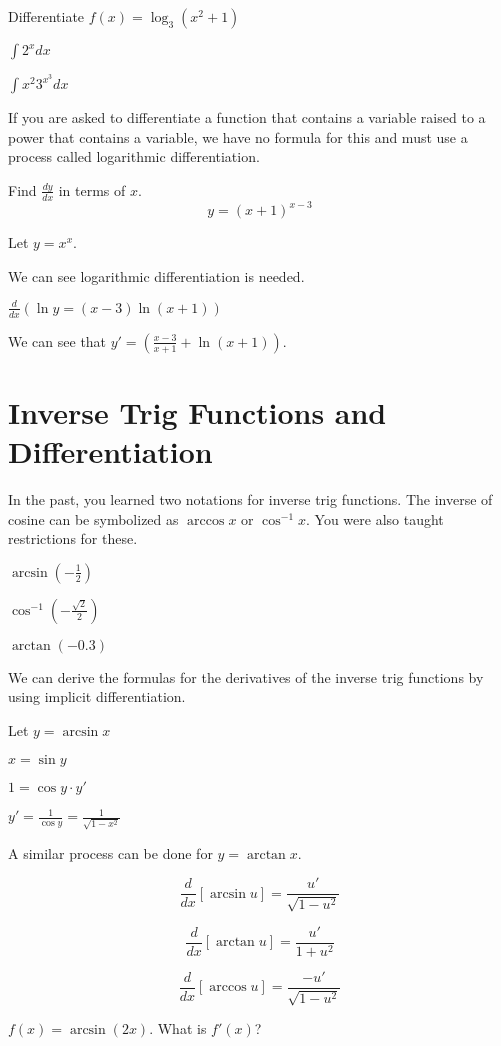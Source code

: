 \documentclass[../bccalc.tex]{subfiles}
\begin{document}
\ex Differentiate $f(x)=\log_3 (x^2+1)$

\ex $\int 2^x dx$

\ex $\int x^2 3^{x^3}dx$

If you are asked to differentiate a function that contains a variable raised to a power that contains a variable, we have no formula for this and must use a process called logarithmic differentiation.

\begin{example}
    Find $\frac{dy}{dx}$ in terms of $x$.
    \[ y=(x+1)^{x-3} \]

    Let $y=x^x$.

    We can see logarithmic differentiation is needed.

    $\frac{d}{dx}(\ln y=(x-3)\ln (x+1))$

    We can see that $y'=\left( \frac{x-3}{x+1}+\ln (x+1)\right)$.
\end{example}

\section{Inverse Trig Functions and Differentiation}
In the past, you learned two notations for inverse trig functions. The inverse of cosine can be symbolized as $\arccos x$ or $\cos^{-1}x$. You were also taught restrictions for these.

\ex $\arcsin\left(-\frac{1}{2}\right)$

\ex $\cos^{-1}\left(-\frac{\sqrt{2}}{2}\right)$

\ex $\arctan(-0.3)$

We can derive the formulas for the derivatives of the inverse trig functions by using implicit differentiation.
\begin{example}
    Let $y=\arcsin x$

    $x=\sin y$
    
    $1=\cos y\cdot y'$

    $y'=\frac{1}{\cos y}=\frac{1}{\sqrt{1-x^2}}$
\end{example}

A similar process can be done for $y=\arctan x$.

\[ \frac{d}{dx}[\arcsin u]=\frac{u'}{\sqrt{1-u^2}} \]

\[ \frac{d}{dx}[\arctan u]=\frac{u'}{1+u^2}\]

\[ \frac{d}{dx}[\arccos u]=\frac{-u'}{\sqrt{1-u^2}} \]

\ex $f(x)=\arcsin(2x)$. What is $f'(x)$?
\end{document}

